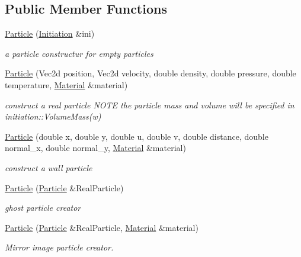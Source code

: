 \subsection*{Public Member Functions}
\begin{CompactItemize}
\item 
\hyperlink{classParticle_91ea71cca6b4c538391fc881bc8da59a}{Particle} (\hyperlink{classInitiation}{Initiation} \&ini)
\begin{CompactList}\small\item\em a particle constructur for empty particles \item\end{CompactList}\item 
\hyperlink{classParticle_5cf658952a598524638d789db59b4249}{Particle} (Vec2d position, Vec2d velocity, double density, double pressure, double temperature, \hyperlink{classMaterial}{Material} \&material)
\begin{CompactList}\small\item\em construct a real particle NOTE the particle mass and volume will be specified in initiation::VolumeMass(w) \item\end{CompactList}\item 
\hyperlink{classParticle_141d53920868e51381f83b6a5d5973d2}{Particle} (double x, double y, double u, double v, double distance, double normal\_\-x, double normal\_\-y, \hyperlink{classMaterial}{Material} \&material)
\begin{CompactList}\small\item\em construct a wall particle \item\end{CompactList}\item 
\hyperlink{classParticle_0c88a1f547bae9946678288ff371acb2}{Particle} (\hyperlink{classParticle}{Particle} \&RealParticle)
\begin{CompactList}\small\item\em ghost particle creator \item\end{CompactList}\item 
\hyperlink{classParticle_4f3ed6cdbd582d85e39622038205f0e1}{Particle} (\hyperlink{classParticle}{Particle} \&RealParticle, \hyperlink{classMaterial}{Material} \&material)
\begin{CompactList}\small\item\em Mirror image particle creator. \item\end{CompactList}\item 

\end{CompactItemize}
